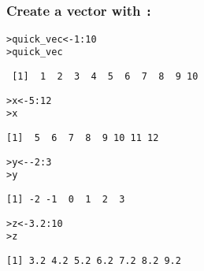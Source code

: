 \documentclass[13pt,aspectratio=169]{beamer}\usepackage[]{graphicx}\usepackage[]{color}
\makeatletter
\newcommand{\hlnum}[1]{\textcolor[rgb]{0.686,0.059,0.569}{#1}}%
\newcommand{\hlopt}[1]{\textcolor[rgb]{0,0,0}{#1}}%
\newcommand{\hlstd}[1]{\textcolor[rgb]{0.345,0.345,0.345}{#1}}%
\newcommand{\hlkwb}[1]{\textcolor[rgb]{0.69,0.353,0.396}{#1}}%
\newenvironment{kframe}{%
 \def\at@end@of@kframe{}%
 \ifinner\ifhmode%
  \def\at@end@of@kframe{\end{minipage}}%
  \begin{minipage}{\columnwidth}%
 \fi\fi%
 \def\FrameCommand##1{\hskip\@totalleftmargin \hskip-\fboxsep
 \colorbox{shadecolor}{##1}\hskip-\fboxsep
     \hskip-\linewidth \hskip-\@totalleftmargin \hskip\columnwidth}%
 \MakeFramed {\advance\hsize-\width
   \@totalleftmargin\z@ \linewidth\hsize
   \@setminipage}}%
 {\par\unskip\endMakeFramed%
 \at@end@of@kframe}
\newenvironment{knitrout}{}{} %
\renewcommand{\tt}[1]{\texttt{#1}}
\renewenvironment{knitrout}{\setlength{\topsep}{0mm}}{}
\makeatother
\begin{document}
\begin{frame}[fragile]
    \frametitle{Create a vector with \tt{:}}
\begin{knitrout}\small
{}\color{fgcolor}\begin{kframe}
\begin{alltt}
\hlstd{> }\hlstd{quick_vec} \hlkwb{<-} \hlnum{1}\hlopt{:}\hlnum{10}
\hlstd{> }\hlstd{quick_vec}
\end{alltt}
\begin{verbatim}
 [1]  1  2  3  4  5  6  7  8  9 10
\end{verbatim}
\begin{alltt}
\hlstd{> }\hlstd{x} \hlkwb{<-} \hlnum{5}\hlopt{:}\hlnum{12}
\hlstd{> }\hlstd{x}
\end{alltt}
\begin{verbatim}
[1]  5  6  7  8  9 10 11 12
\end{verbatim}
\begin{alltt}
\hlstd{> }\hlstd{y} \hlkwb{<-} \hlopt{-}\hlnum{2}\hlopt{:}\hlnum{3}
\hlstd{> }\hlstd{y}
\end{alltt}
\begin{verbatim}
[1] -2 -1  0  1  2  3
\end{verbatim}
\begin{alltt}
\hlstd{> }\hlstd{z} \hlkwb{<-} \hlnum{3.2}\hlopt{:}\hlnum{10}
\hlstd{> }\hlstd{z}
\end{alltt}
\begin{verbatim}
[1] 3.2 4.2 5.2 6.2 7.2 8.2 9.2
\end{verbatim}
\end{kframe}
\end{knitrout}
\end{frame}
\end{document}
